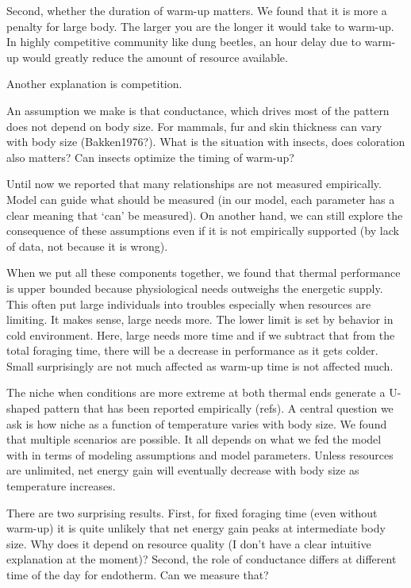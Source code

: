 Second, whether the duration of warm-up matters.
We found that it is more a penalty for large body.
The larger you are the longer it would take to warm-up.
In highly competitive community like dung beetles, an hour delay due to warm-up would greatly reduce the amount of resource available. 

Another explanation is competition.

An assumption we make is that conductance, which drives most of the pattern does not depend on body size.
For mammals, fur and skin thickness can vary with body size (Bakken1976?).
What is the situation with insects, does coloration also matters?
Can insects optimize the timing of warm-up?

Until now we reported that many relationships are not measured empirically.
Model can guide what should be measured (in our model, each parameter has a clear meaning that `can' be measured).
On another hand, we can still explore the consequence of these assumptions even if it is not empirically supported (by lack of data, not because it is wrong).

When we put all these components together, we found that thermal performance is upper bounded because physiological needs outweighs the energetic supply.
This often put large individuals into troubles especially when resources are limiting.
It makes sense, large needs more.
The lower limit is set by behavior in cold environment.
Here, large needs more time and if we subtract that from the total foraging time,  there will be a decrease in performance as it gets colder.
Small surprisingly are not much affected as warm-up time is not affected much.

The niche when conditions are more extreme at both thermal ends generate a U-shaped pattern that has been reported empirically (refs).
A central question we ask is how  niche as a function of temperature varies with body size.
We found that multiple scenarios are possible.
It all depends on what we fed the model with in terms of modeling assumptions and model parameters.
Unless resources are unlimited, net energy gain will eventually decrease with body size as temperature increases.

There are two surprising results.
First, for fixed foraging time (even without warm-up) it is quite unlikely that net energy gain peaks at intermediate body size.
Why does it depend on resource quality (I don't have a clear intuitive explanation at the moment)?
Second, the role of conductance differs at different time of the day for endotherm.
Can we measure that?  

